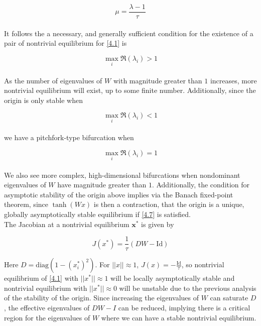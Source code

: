 \documentclass[paper=a4, fontsize=11pt]{scrartcl} %
\numberwithin{equation}{section} %
\numberwithin{figure}{section} %
\numberwithin{table}{section} %
\newcommand \bf[1]{\mathbf #1}
\begin{document}
\begin{equation}
\mu = \frac{\lambda-1}{\tau}
\end{equation}
\\
It follows the a necessary, and generally sufficient condition for the existence of a pair of nontrivial equilibrium for \eqref{4.1} is

\begin{equation}
\max_i \mathfrak{R}(\lambda_i) > 1
\end{equation}
\\
As the number of eigenvalues of $W$ with magnitude greater than $1$ increases, more nontrivial equilibrium will exist, up to some finite number. Additionally, since the origin is only stable when 

\begin{equation} \label{4.7}
\max_i \mathfrak{R}(\lambda_i) < 1
\end{equation}
\\
we have a pitchfork-type bifurcation when

\begin{equation} \label{4.8}
\max_i \mathfrak{R}(\lambda_i) = 1
\end{equation}
\\
We also see more complex, high-dimensional bifurcations when nondominant eigenvalues of $W$ have magnitude greater than $1$. Additionally, the condition for asymptotic stability of the origin above implies via the Banach fixed-point theorem, since $\tanh(Wx)$ is then a contraction, that the origin is a unique, globally asymptotically stable equilibrium if \eqref{4.7} is satisfied.
\vspace{0.5cm}
\\
The Jacobian at a nontrivial equilibrium $\bf x^*$ is given by

\begin{equation}
J(x^*) = \frac{1}{\tau}(DW - \text{Id})
\end{equation}

Here $D = \text{diag} (1 - (x_i^*)^2)$. For $||x|| \approx 1$, $J(x) = -\frac{\text{Id}}{\tau}$, so nontrivial equilibrium of \eqref{4.1} with $||x^*|| \approx 1$ will be locally asymptotically stable and nontrivial equilibrium with $||x^*|| \approx 0$ will be unstable due to the previous analysis of the stability of the origin. Since increasing the eigenvalues of $W$ can saturate $D$, the effective eigenvalues of $DW - I$ can be reduced, implying there is a critical region for the eigenvalues of $W$ where we can have a stable nontrivial equilibrium.
\end{document}
